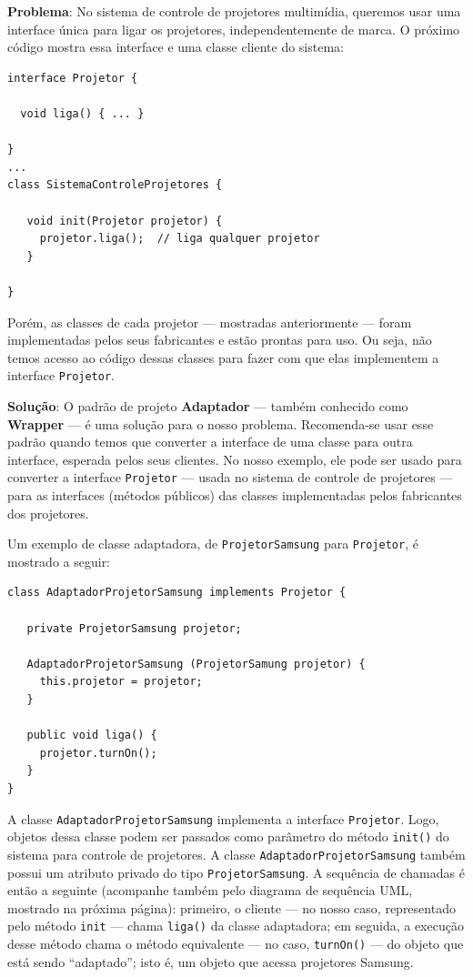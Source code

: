 \documentclass[
  11pt,
  twoside]{book}
\newcommand{\passthrough}[1]{#1}
\begin{document}
\textbf{Problema}: No sistema de controle de projetores multimídia,
queremos usar uma interface única para ligar os projetores,
independentemente de marca. O próximo código mostra essa interface e uma
classe cliente do sistema:

\begin{lstlisting}
interface Projetor {

  void liga() { ... }

}
...
class SistemaControleProjetores {

   void init(Projetor projetor) {
     projetor.liga();  // liga qualquer projetor
   }

}
\end{lstlisting}

Porém, as classes de cada projetor --- mostradas anteriormente --- foram
implementadas pelos seus fabricantes e estão prontas para uso. Ou seja,
não temos acesso ao código dessas classes para fazer com que elas
implementem a interface \passthrough{\lstinline!Projetor!}.

 \textbf{Solução}: O padrão de projeto \textbf{Adaptador}
--- também conhecido como \textbf{Wrapper} --- é uma solução para o
nosso problema. Recomenda-se usar esse padrão quando temos que converter
a interface de uma classe para outra interface, esperada pelos seus
clientes. No nosso exemplo, ele pode ser usado para converter a
interface \passthrough{\lstinline!Projetor!} --- usada no sistema de
controle de projetores --- para as interfaces (métodos públicos) das
classes implementadas pelos fabricantes dos projetores.

Um exemplo de classe adaptadora, de
\passthrough{\lstinline!ProjetorSamsung!} para
\passthrough{\lstinline!Projetor!}, é mostrado a seguir: \newpage

\begin{lstlisting}
class AdaptadorProjetorSamsung implements Projetor {

   private ProjetorSamsung projetor;

   AdaptadorProjetorSamsung (ProjetorSamung projetor) {
     this.projetor = projetor;
   }

   public void liga() {
     projetor.turnOn();
   }
}
\end{lstlisting}

A classe \passthrough{\lstinline!AdaptadorProjetorSamsung!} implementa a
interface \passthrough{\lstinline!Projetor!}. Logo, objetos dessa classe
podem ser passados como parâmetro do método
\passthrough{\lstinline!init()!} do sistema para controle de projetores.
A classe \passthrough{\lstinline!AdaptadorProjetorSamsung!} também
possui um atributo privado do tipo
\passthrough{\lstinline!ProjetorSamsung!}. A sequência de chamadas é
então a seguinte (acompanhe também pelo diagrama de sequência UML,
mostrado na próxima página): primeiro, o cliente --- no nosso caso,
representado pelo método \passthrough{\lstinline!init!} --- chama
\passthrough{\lstinline!liga()!} da classe adaptadora; em seguida, a
execução desse método chama o método equivalente --- no caso,
\passthrough{\lstinline!turnOn()!} --- do objeto que está sendo
``adaptado''; isto é, um objeto que acessa projetores Samsung.
\end{document}
